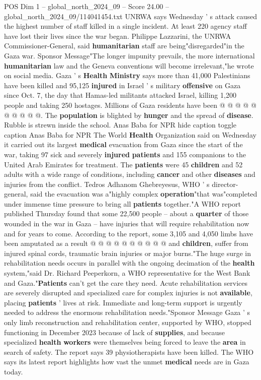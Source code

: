 \begin{textsample}{POS Dim 1 – global\_north\_2024\_09 – Score 24.00 – global\_north\_2024\_09/114041454.txt}
UNRWA says Wednesday ' s attack caused the highest number of staff killed in a single incident.
At least 220 agency staff have lost their lives since the war began.
Philippe Lazzarini, the UNRWA Commissioner-General, said \textbf{humanitarian} staff are being"disregarded"in the Gaza war.
Sponsor Message"The longer impunity prevails, the more international \textbf{humanitarian} law and the Geneva conventions will become irrelevant,"he wrote on social media.
Gaza ' s \textbf{Health} \textbf{Ministry} says more than 41,000 Palestinians have been killed and 95,125 \textbf{injured} in Israel ' s military \textbf{offensive} on Gaza since Oct. 7, the day that Hamas-led militants attacked Israel, killing 1,200 people and taking 250 hostages.
Millions of Gaza residents have been @ @ @ @ @ @ @ @ @ @.
The \textbf{population} is blighted by \textbf{hunger} and the spread of \textbf{disease}.
Rubble is strewn inside the school.
Anas Baba for NPR hide caption toggle caption Anas Baba for NPR The World \textbf{Health} Organization said on Wednesday it carried out its largest \textbf{medical} evacuation from Gaza since the start of the war, taking 97 sick and severely \textbf{injured} \textbf{patients} and 155 companions to the United Arab Emirates for treatment.
The \textbf{patients} were 45 \textbf{children} and 52 adults with a wide range of conditions, including \textbf{cancer} and other \textbf{diseases} and injuries from the conflict.
Tedros Adhanom Ghebreyesus, WHO ' s director-general, said the evacuation was a"highly complex \textbf{operation}"that was"completed under immense time pressure to bring all \textbf{patients} together."A WHO report published Thursday found that some 22,500 people -- about a \textbf{quarter} of those wounded in the war in Gaza -- have injuries that will require rehabilitation now and for years to come.
According to the report, some 3,105 and 4,050 limbs have been amputated as a result @ @ @ @ @ @ @ @ @ @ and \textbf{children}, suffer from injured spinal cords, traumatic brain injuries or major burns."The huge surge in rehabilitation needs occurs in parallel with the ongoing decimation of the \textbf{health} system,"said Dr.
Richard Peeperkorn, a WHO representative for the West Bank and Gaza."\textbf{Patients} can't get the care they need.
Acute rehabilitation services are severely disrupted and specialized care for complex injuries is not \textbf{available}, placing \textbf{patients} ' lives at risk.
Immediate and long-term support is urgently needed to address the enormous rehabilitation needs."Sponsor Message Gaza ' s only limb reconstruction and rehabilitation center, supported by WHO, stopped functioning in December 2023 because of lack of \textbf{supplies}, and because specialized \textbf{health} \textbf{workers} were themselves being forced to leave the \textbf{area} in search of safety.
The report says 39 physiotherapists have been killed.
The WHO says its latest report highlights how vast the unmet \textbf{medical} needs are in Gaza today.


\end{textsample}
